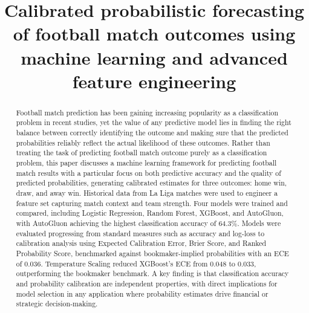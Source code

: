 \documentclass[conference]{IEEEtran}
\begin{document}
\title{Calibrated probabilistic forecasting of football match
outcomes using machine learning and advanced feature engineering}

\author{
\and
{}
}

\maketitle

\begin{abstract}
Football match prediction has been gaining increasing popularity as a classification problem in recent studies, yet the value of any predictive model lies in finding the right balance between correctly identifying the outcome and making sure that the predicted probabilities reliably reflect the actual likelihood of these outcomes. Rather than treating the task of predicting football match outcome purely as a classification problem, this paper discusses a machine learning framework for predicting football match results with a particular focus on both predictive accuracy and the quality of predicted probabilities, generating calibrated estimates for three outcomes: home win, draw, and away win. Historical data from La Liga matches were used to engineer a feature set capturing match context and team strength. Four models were trained and compared, including Logistic Regression, Random Forest, XGBoost, and AutoGluon, with AutoGluon achieving the highest classification accuracy of 64.3\%. Models were evaluated progressing from standard measures such as accuracy and log-loss to calibration analysis using Expected Calibration Error, Brier Score, and Ranked Probability Score, benchmarked against bookmaker-implied probabilities with an ECE of 0.036. Temperature Scaling reduced XGBoost's ECE from 0.048 to 0.033, outperforming the bookmaker benchmark. A key finding is that classification accuracy and probability calibration are independent properties, with direct implications for model selection in any application where probability estimates drive financial or strategic decision-making.
\end{abstract}
\end{document}
